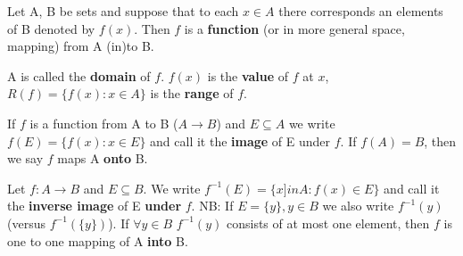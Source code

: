 \documentclass[11pt,fleqn]{book} %
\begin{document}
\begin{definition}
	Let A, B be sets and suppose that to each $x \in A$ there corresponds an elements of B denoted by $f(x)$. Then $f$ is a \textbf{function} (or in more general space, mapping) from A (in)to B. 

	A is called the \textbf{domain} of $f$. $f(x)$ is the \textbf{value} of $f$ at $x$, $R(f) = \{f(x): x \in A\}$ is the \textbf{range} of $f$.
\end{definition}

\begin{definition}[Image]
	If $f$ is a function from A to B ($A \rightarrow B$) and $E \subseteq A$ we write $f(E) = \{f(x): x \in E\}$ and call it the \textbf{image} of E under $f$.
	If $f(A) = B$, then we say $f$ maps A \textbf{onto} B.
\end{definition}

\begin{definition}
	Let $f: A \rightarrow B$ and $E \subseteq B$. We write $f^{-1}(E) = \{x ]in A : f(x) \in E\}$ and call it the \textbf{inverse image} of E \textbf{under} $f$.
	NB: If $E =\{y\}, y \in B$ we also write $f^{-1}(y)$ (versus $f^{-1}(\{y\})$). If $\forall y \in B$ $f^{-1}(y)$ consists of at most one element, then $f$ is one to one mapping of A \textbf{into} B.
\end{definition}






\end{document}

